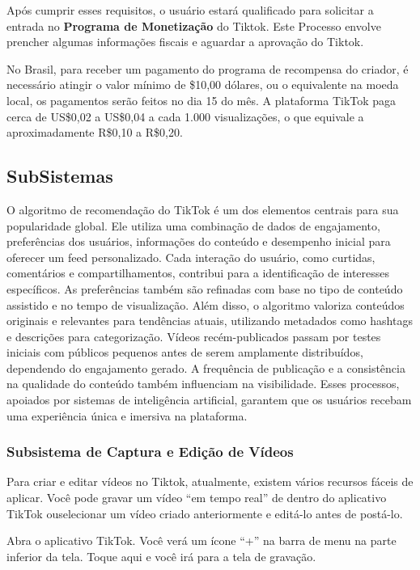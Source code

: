 Após cumprir esses requisitos, o usuário estará qualificado para solicitar a entrada no \textbf{Programa de Monetização} do Tiktok. Este Processo envolve prencher algumas informações fiscais e aguardar a aprovação do Tiktok.\vskip0.3cm

No Brasil, para receber um pagamento do programa de recompensa do criador, é necessário atingir o valor mínimo de \$10,00 dólares, ou o equivalente na moeda local, os pagamentos serão feitos no dia 15 do mês. A plataforma TikTok paga cerca de US\$0,02 a US\$0,04 a cada 1.000 visualizações, o que equivale a aproximadamente R\$0,10 a R\$0,20.


\subsection{SubSistemas}

O algoritmo de recomendação do TikTok é um dos elementos centrais para sua popularidade global. Ele utiliza uma combinação de dados de engajamento, preferências dos usuários, informações do conteúdo e desempenho inicial para oferecer um feed personalizado. Cada interação do usuário, como curtidas, comentários e compartilhamentos, contribui para a identificação de interesses específicos. As preferências também são refinadas com base no tipo de conteúdo assistido e no tempo de visualização. Além disso, o algoritmo valoriza conteúdos originais e relevantes para tendências atuais, utilizando metadados como hashtags e descrições para categorização. Vídeos recém-publicados passam por testes iniciais com públicos pequenos antes de serem amplamente distribuídos, dependendo do engajamento gerado. A frequência de publicação e a consistência na qualidade do conteúdo também influenciam na visibilidade. Esses processos, apoiados por sistemas de inteligência artificial, garantem que os usuários recebam uma experiência única e imersiva na plataforma.



\subsubsection{Subsistema de Captura e Edição de Vídeos}

Para criar e editar vídeos no Tiktok, atualmente, existem vários recursos fáceis de aplicar. Você pode gravar um vídeo “em tempo real” de dentro do aplicativo TikTok ouselecionar um vídeo criado anteriormente e editá-lo antes de postá-lo. \vskip0.3cm

Abra o aplicativo TikTok. Você verá um ícone “+” na barra de menu na parte inferior da tela. Toque aqui e você irá para a tela de gravação.\vskip0.3cm

